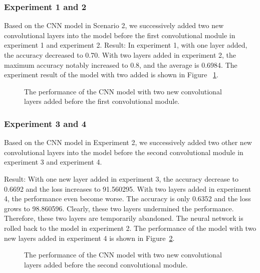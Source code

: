 \documentclass[]{UCD_CS_FYP_Report}
\begin{document}
\subsubsection{Experiment 1 and 2}
Based on the CNN model in Scenario 2, we successively added two new convolutional layers into the model before the first convolutional module in experiment 1 and experiment 2.
Result: In experiment 1, with one layer added, the accuracy decreased to 0.70. With two layers added in experiment 2, the maximum accuracy notably increased to 0.8, and the average is 0.6984. The experiment result of the model with two added is shown in Figure ~\ref{fig:CIFAR_10_CNN_S3E2}. 
\begin{figure}[h]
\centering
\fboxsep 2mm
\caption{\label{fig:CIFAR_10_CNN_S3E2} The performance of the CNN model with two new convolutional layers added before the first convolutional module.}
\end{figure}
%
\subsubsection{Experiment 3 and 4}
Based on the CNN model in Experiment 2, we successively added two other new convolutional layers into the model before the second convolutional module in experiment 3 and experiment 4.

Result: With one new layer added in experiment 3, the accuracy decrease to 0.6692 and the loss increases to 91.560295. With two layers added in experiment 4, the performance even become worse. The accuracy is only 0.6352 and the loss grows to 98.860596. Clearly, these two layers undermined the performance. Therefore, these two layers are temporarily abandoned.  The neural network is rolled back to the model in experiment 2. The performance of the model with two new layers added in experiment 4 is shown in Figure~\ref{fig:CIFAR_10_CNN_S3E4}.
\begin{figure}[h]
\centering
\fboxsep 2mm
\caption{\label{fig:CIFAR_10_CNN_S3E4} The performance of the CNN model with two new convolutional layers added before the second convolutional module.}
\end{figure}
\end{document}
